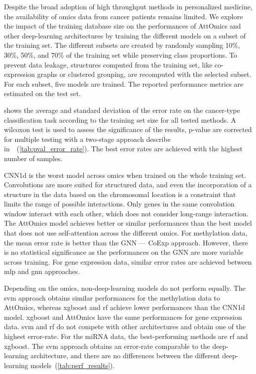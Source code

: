 \documentclass[../main.tex]{subfiles}
\begin{document}
	    Despite the broad adoption of high throughput methods in personalized medicine, the availability of omics data from cancer patients remains limited.
	    We explore the impact of the training database size on the performances of AttOmics and other deep-learning architectures by training the different models on a subset of the training set.
	    The different subsets are created by randomly sampling 10\%, 30\%, 50\%, and 70\% of the training set while preserving class proportions.
	    To prevent data leakage, structures computed from the training set, like co-expression graphs or clustered grouping, are recomputed with the selected subset.
	    For each subset, five models are trained.
	    The reported performance metrics are estimated on the test set.

	     shows the average and standard deviation of the error rate on the cancer-type classification task according to the training set size for all tested methods.
	    A wilcoxon test is used to assess the significance of the results, p-value are corrected for multiple testing with a two-stage approach describe in~\cite{10.2307/2346101}~(\cref{tab:pval_error_rate}).
	    The best error rates are achieved with the highest number of samples.

	    CNN1d is the worst model across omics when trained on the whole training set.
	    Convolutions are more suited for structured data, and even the incorporation of a structure in the data based on the chromosomal location is a constraint that limits the range of possible interactions.
	    Only genes in the same convolution window interact with each other, which does not consider long-range interaction.
	    The AttOmics model achieves better or similar performances than the best model that does not use self-attention across the different omics.
	    For methylation data, the mean error rate is better than the GNN --- CoExp approach.
	    However, there is no statistical significance as the performances on the GNN are more variable across training.
	    For gene expression data, similar error rates are achieved between \gls{mlp} and \gls{gnn} approaches.

	    Depending on the omics, non-deep-learning models do not perform equally.
	    The \gls{svm} approach obtains similar performances for the methylation data to AttOmics, whereas \gls{xgboost} and \gls{rf} achieve lower performances than the CNN1d model.
	    \gls{xgboost} and AttOmics have the same performances for gene expression data.
	    \gls{svm} and \gls{rf} do not compete with other architectures and obtain one of the highest error-rate.
	    For the miRNA data, the best-performing methods are \gls{rf} and \gls{xgboost}.
	    The \gls{svm} approach obtains an error-rate comparable to the deep-learning architecture, and there are no differences between the different deep-learning models~(\cref{tab:perf_results}).
\end{document}
